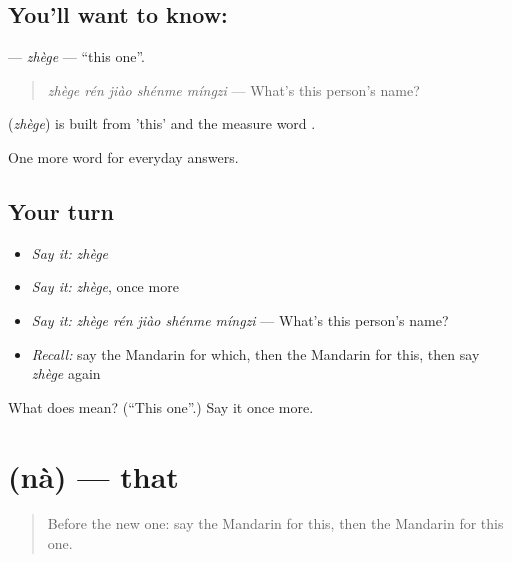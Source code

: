 \subsection*{You'll want to know: }
\textbf{} — \emph{zhège} — \textquotedblleft{}this one\textquotedblright{}.

\begin{quote}
\textbf{} \emph{zhège rén jiào shénme míngzi} — What's this person's name?
\end{quote}

\begin{cousinweb}
\textbf{} (\emph{zhège}) is built from  'this' and the measure word .
\end{cousinweb}

\begin{grammarlens}[title={What you've built}]
One more word for everyday answers.
\end{grammarlens}

\subsection*{Your turn}
\begin{itemize}
\raggedright
  \item \emph{Say it:} \emph{zhège}
  \item \emph{Say it:} \emph{zhège}, once more
  \item \emph{Say it:} \emph{zhège rén jiào shénme míngzi} — What's this person's name?
  \item \emph{Recall:} say the Mandarin for which, then the Mandarin for this, then say \emph{zhège} again
\end{itemize}

\begin{tcolorbox}[breakable,colback=teal!4,colframe=teal!35!black,title={Before you move on}]
What does  mean? (\textquotedblleft{}This one\textquotedblright{}.) Say it once more.
\end{tcolorbox}
\section[\texorpdfstring{\zh{那} (nà)}{那 (nà)}]{ (nà) — that}

\label{lesson:ZH-C37-na}



\begin{quote}
Before the new one: say the Mandarin for this, then the Mandarin for this one.
\end{quote}

